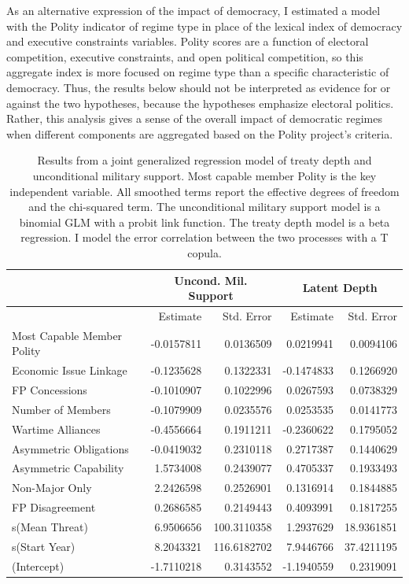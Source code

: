 \documentclass[12pt]{article}
\begin{document}
As an alternative expression of the impact of democracy, I estimated a model with the Polity indicator of regime type in place of the lexical index of democracy and executive constraints variables. 
Polity scores are a function of electoral competition, executive constraints, and open political competition, so this aggregate index is more focused on regime type than a specific characteristic of democracy. 
Thus, the results below should not be interpreted as evidence for or against the two hypotheses, because the hypotheses emphasize electoral politics.
Rather, this analysis gives a sense of the overall impact of democratic regimes when different components are aggregated based on the Polity project's criteria. 


\begin{table}[ht]
\centering
\begin{tabular}{lrrrr}
  & \multicolumn{2}{c}{Uncond. Mil. Support} & \multicolumn{2}{c}{Latent Depth}\\ \hline
 & Estimate & Std. Error & Estimate & Std. Error\\ 
  \hline
  Most Capable Member Polity & -0.0157811 & 0.0136509 & 0.0219941 & 0.0094106 \\ 
  Economic Issue Linkage & -0.1235628 & 0.1322331 & -0.1474833 & 0.1266920 \\ 
  FP Concessions & -0.1010907 & 0.1022996 & 0.0267593 & 0.0738329 \\ 
  Number of Members & -0.1079909 & 0.0235576 & 0.0253535 & 0.0141773 \\ 
  Wartime Alliances & -0.4556664 & 0.1911211 & -0.2360622 & 0.1795052 \\ 
  Asymmetric Obligations & -0.0419032 & 0.2310118 & 0.2717387 & 0.1440629 \\ 
  Asymmetric Capability & 1.5734008 & 0.2439077 & 0.4705337 & 0.1933493 \\ 
  Non-Major Only & 2.2426598 & 0.2526901 & 0.1316914 & 0.1844885 \\ 
  FP Disagreement & 0.2686585 & 0.2149443 & 0.4093991 & 0.1817255 \\ 
  s(Mean Threat) & 6.9506656 & 100.3110358 & 1.2937629 & 18.9361851 \\ 
  s(Start Year) & 8.2043321 & 116.6182702 & 7.9446766 & 37.4211195 \\ 
  (Intercept) & -1.7110218 & 0.3143552 & -1.1940559 & 0.2319091 \\ 
   \hline
\end{tabular}
\caption{Results from a joint generalized regression model of treaty depth and unconditional military support. 
          Most capable member Polity is the key independent variable. 
                     All smoothed terms report the effective degrees of freedom and the chi-squared term. 
                     The unconditional military support model is a binomial GLM with a probit link function. 
                     The treaty depth model is a beta regression. 
                     I model the error correlation between the two processes with a T copula.} 
\label{tab:gjrm-res-agg}
\end{table}
\end{document}
